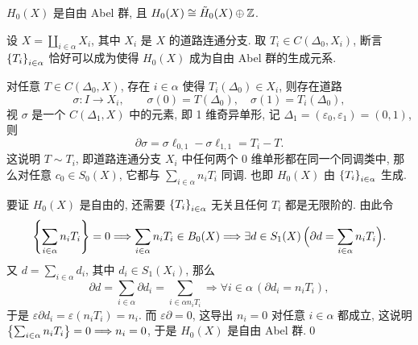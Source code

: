 \begin{Theorem}
	$ H_0(X) $ 是自由 Abel 群, 且 $ H_0(X)\cong \tilde{H}_0(X)\oplus\mathbb{Z} $.
\end{Theorem}
\begin{Proof}
	设 $ X=\coprod_{i\in\alpha}X_i $, 其中 $ X_i $ 是 $ X $ 的道路连通分支. 取 $ T_i\in C(\Delta_0,X_i) $, 断言 $ \left\{ T_i \right\}_{i\in\alpha} $ 恰好可以成为使得 $ H_0(X) $ 成为自由 Abel 群的生成元系.

	对任意 $ T\in C(\Delta_0,X) $, 存在 $ i\in\alpha $ 使得 $ T_i(\Delta_0)\in X_i $, 则存在道路
	\[
		\sigma : I\to X_i,\qquad \sigma(0)=T(\Delta_0),\quad \sigma(1)=T_i(\Delta_0),
	\]
	视 $ \sigma $ 是一个 $ C(\Delta_1,X) $ 中的元素, 即 1 维奇异单形, 记 $ \Delta_1=(\varepsilon_0,\varepsilon_1)=(0,1) $, 则
	\[
		\partial\sigma=\sigma\ell_{0,1}-\sigma\ell_{1,1}=T_i-T.
	\]
	这说明 $ T\sim T_i $, 即道路连通分支 $ X_i $ 中任何两个 0 维单形都在同一个同调类中, 那么对任意 $ c_0\in S_0(X) $, 它都与 $ \sum_{i\in\alpha}n_iT_i $ 同调. 也即 $ H_0(X) $ 由 $ \left\{ T_i \right\}_{i\in\alpha} $ 生成.

	要证 $ H_0(X) $ 是自由的, 还需要 $ \left\{ T_i \right\}_{i\in\alpha} $ 无关且任何 $ T_i $ 都是无限阶的. 由此令
	\[
		\left\{ \sum_{i\in\alpha}n_iT_i \right\}=0\Longrightarrow\sum_{i\in\alpha}n_iT_i\in B_0(X)\Longrightarrow\exists d\in S_1(X)\,\Big(\partial d=\sum_{i\in\alpha}n_iT_i\Big).
	\]
	又 $ d=\sum_{i\in\alpha}d_i $, 其中 $ d_i\in S_1(X_i) $, 那么
	\[
		\partial d=\sum_{i\in\alpha}\partial d_i=\sum_{i\in\alpha n_iT_i}\Longrightarrow\forall i\in\alpha\,(\partial d_i=n_iT_i),
	\]
	于是 $ \varepsilon\partial d_i=\varepsilon(n_iT_i)=n_i $. 而 $ \varepsilon\partial=0 $, 这导出 $ n_i=0 $ 对任意 $ i\in\alpha $ 都成立, 这说明 $ \left\{ \sum_{i\in\alpha}n_iT_i \right\}=0\Longrightarrow n_i=0 $, 于是 $ H_0(X) $ 是自由 Abel 群.\qed
\end{Proof}


